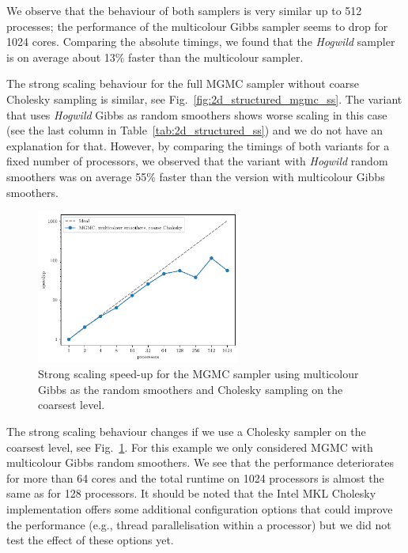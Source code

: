 \documentclass[
fontsize=11pt,
paper=a4,
numbers=noenddot
]{scrartcl}
\begin{document}
We observe that the behaviour of both samplers is very similar up to 512 processes; the performance of the multicolour Gibbs sampler seems to drop for 1024 cores. Comparing the absolute timings, we found that the \emph{Hogwild} sampler is on average about 13\% faster than the multicolour sampler.

The strong scaling behaviour for the full MGMC sampler without coarse Cholesky sampling is similar, see Fig.~\ref{fig:2d_structured_mgmc_ss}. The variant that uses \emph{Hogwild} Gibbs as random smoothers shows worse scaling in this case (see the last column in Table~\ref{tab:2d_structured_ss}) and we do not have an explanation for that. However, by comparing the timings of both variants for a fixed number of processors, we observed that the variant with \emph{Hogwild} random smoothers was on average 55\% faster than the version with multicolour Gibbs smoothers.

\begin{figure}[htbp]
    \centering
    \includegraphics[width=0.6\textwidth]{plots/strong_scaling_mgmc+mg+cholesky_4097x4097.pdf}
    \caption{Strong scaling speed-up for the MGMC sampler using multicolour Gibbs as the random smoothers and Cholesky sampling on the coarsest level.}
    \label{fig:2d_structured_mgmc_chol_ss}
\end{figure}

The strong scaling behaviour changes if we use a Cholesky sampler on the coarsest level, see Fig.~\ref{fig:2d_structured_mgmc_chol_ss}. For this example we only considered MGMC with multicolour Gibbs random smoothers. We see that the performance deteriorates for more than 64 cores and the total runtime on 1024 processors is almost the same as for 128 processors. It should be noted that the Intel MKL Cholesky implementation offers some additional configuration options that could improve the performance (e.g., thread parallelisation within a processor) but we did not test the effect of these options yet.
\end{document}
